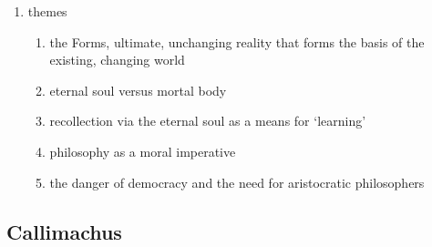 \documentclass[12pt]{article}
\begin{document}
\begin{enumerate}
\begin{enumerate}
        \begin{enumerate}
        \item \textit{Cratylus} is in the middle period, when Plato starts to break away from Socratic influence/style 
        \end{enumerate}
    \item nearly all in dialogue format, featuring two or more interlocutors in discussion
        \begin{enumerate}
        \item potentially influenced by comedic theater and rhetoric
        \end{enumerate}
    \end{enumerate}
\item themes
    \begin{enumerate}
    \item the Forms, ultimate, unchanging reality that forms the basis of the existing, changing world
    \item eternal soul versus mortal body
    \item recollection via the eternal soul as a means for `learning'
    \item philosophy as a moral imperative
    \item the danger of democracy and the need for aristocratic philosophers
    \end{enumerate}
\end{enumerate}

\subsection{Callimachus}
\end{document}
